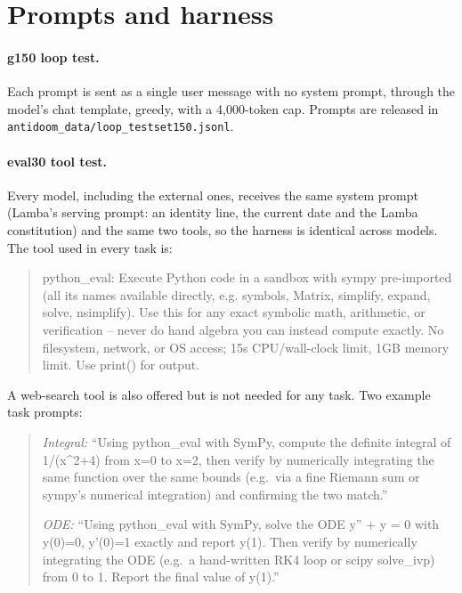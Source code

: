 \documentclass[11pt]{article}
\begin{document}
\section{Prompts and harness}
\label{app:prompts}

\paragraph{g150 loop test.} Each prompt is sent as a single user message with no system prompt, through the model's chat template, greedy, with a 4,000-token cap. Prompts are released in \texttt{antidoom\_data/}\allowbreak\texttt{loop\_testset150.jsonl}.

\paragraph{eval30 tool test.} Every model, including the external ones, receives the same system prompt (Lamba's serving prompt: an identity line, the current date and the Lamba constitution) and the same two tools, so the harness is identical across models. The tool used in every task is:

\begin{quote}\small\ttfamily\raggedright
python\_eval: Execute Python code in a sandbox with sympy pre-imported (all its names available directly, e.g. symbols, Matrix, simplify, expand, solve, nsimplify). Use this for any exact symbolic math, arithmetic, or verification -- never do hand algebra you can instead compute exactly. No filesystem, network, or OS access; 15s CPU/wall-clock limit, 1GB memory limit. Use print() for output.
\end{quote}

A web-search tool is also offered but is not needed for any task. Two example task prompts:

\begin{quote}\small
\emph{Integral:} ``Using python\_eval with SymPy, compute the definite integral of 1/(x\^{}2+4) from x=0 to x=2, then verify by numerically integrating the same function over the same bounds (e.g.\ via a fine Riemann sum or sympy's numerical integration) and confirming the two match.''

\emph{ODE:} ``Using python\_eval with SymPy, solve the ODE y'' + y = 0 with y(0)=0, y'(0)=1 exactly and report y(1). Then verify by numerically integrating the ODE (e.g.\ a hand-written RK4 loop or scipy solve\_ivp) from 0 to 1. Report the final value of y(1).''
\end{quote}
\end{document}
